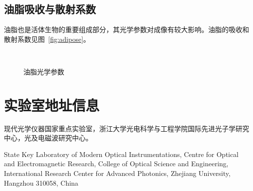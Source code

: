 \documentclass[cn,11pt,chinese]{elegantbook}
\begin{document}
\subsection{油脂吸收与散射系数}
油脂也是活体生物的重要组成部分，其光学参数对成像有较大影响。油脂的吸收和散射系数见图~\vref{fig:adipose}。
\begin{figure}[htp]
	\centering
	 \\
  \caption{油脂光学参数}
	\label{fig:adipose}
\end{figure}

\section{实验室地址信息}
现代光学仪器国家重点实验室，浙江大学光电科学与工程学院国际先进光子学研究中心，光及电磁波研究中心。

State Key Laboratory of Modern Optical Instrumentations, Centre for Optical and
Electromagnetic Research, College of Optical Science and Engineering, International
Research Center for Advanced Photonics, Zhejiang University, Hangzhou 310058, China


\end{document}
